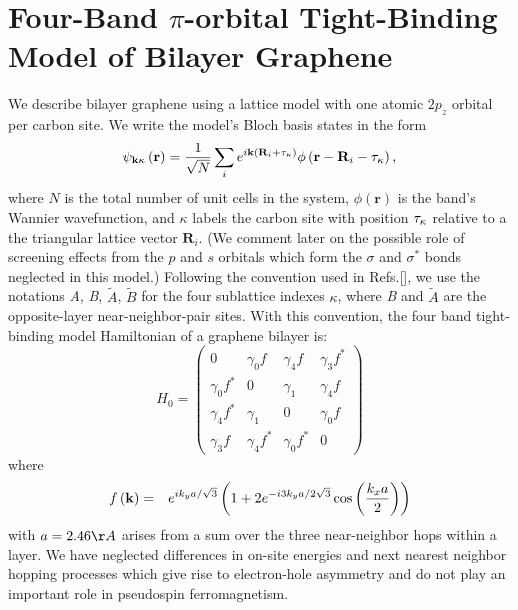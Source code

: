 \documentclass[twocolumn,prb,showpacs,preprintnumbers,amsmath,amssymb]{revtex4}
\begin{document}
\section{Four-Band $\pi$-orbital Tight-Binding Model of Bilayer Graphene}
We describe bilayer graphene using a lattice model with one atomic $2 p_z$ orbital per carbon site.
We write the model's Bloch basis states in the form
\begin{equation}
\label{basis}
\psi_{{\bf k}\kappa} \left({\mathbf r} \right) = \frac{1}{\sqrt{N}} \sum_{i} e^{i {\mathbf k} \left( {\mathbf R}_i + {\bf \tau}_{\kappa} \right)} 
\phi \left({\mathbf r} - {\mathbf R}_i - {\bf \tau}_{\kappa} \right),
\end{equation}
where $N$ is the total number of unit cells in the system, $\phi  \left({\mathbf r} \right)$ is the band's 
Wannier wavefunction, and $\kappa$ labels the carbon site with position 
${\bf \tau}_{\kappa}$ relative to a the triangular lattice vector ${\mathbf R}_i$.
(We comment later on the possible role of screening effects from
the $p$ and $s$ orbitals which form the $\sigma$ and $\sigma^*$ bonds
neglected in this model.)
Following the convention used in Refs.[],
we use the notations {\em A}, {\em B}, $\tilde{A}$, $\tilde{B}$ for the four sublattice indexes $\kappa$,
where {\em B} and $\tilde{A}$ are the opposite-layer near-neighbor-pair sites. 
With this convention, the four band tight-binding model Hamiltonian of a graphene bilayer is:
\begin{equation}
\label{hamil}
{H}_0= 
\begin{pmatrix}
     0 & \gamma_0 f & \gamma_4 f & \gamma_3 f^*   \\
\gamma_0 f^*    & 0 & \gamma_1 & \gamma_4 f  \\
\gamma_4 f^*   & \gamma_1 & 0 &  \gamma_0 f  \\
 \gamma_3 f & \gamma_4 f^* & \gamma_0 f^* & 0
\end{pmatrix}
\end{equation}
where
\begin{eqnarray}
f\left( {\bf k} \right) &=&   e^{ i k_y a / \sqrt{3} } \left( 1 + 2 e^{-i 3 k_{y} a / 2\sqrt{3}}  
                                       \cos \left(  \frac{k_x a}{2} \right)    \right)  
\end{eqnarray}
with $a = 2.46 \AA$ arises from a sum over the three near-neighbor hops within a layer. 
We have neglected differences in on-site energies and next nearest neighbor hopping processes 
which give rise to electron-hole asymmetry and do not play an important role in pseudospin ferromagnetism.
\end{document}
